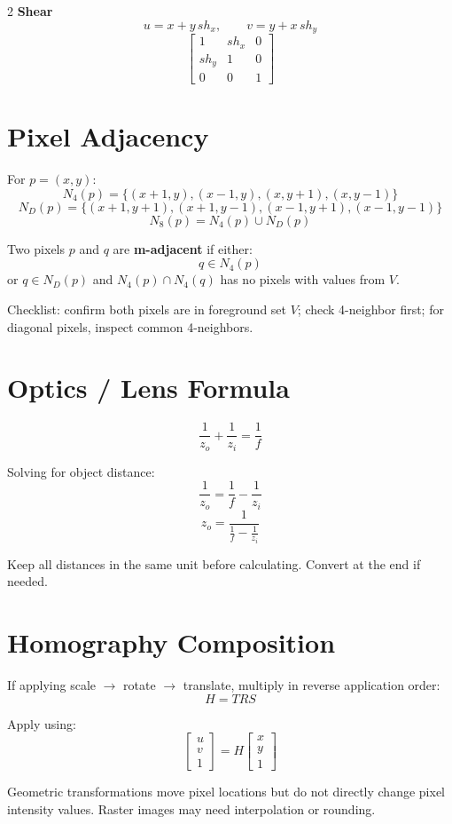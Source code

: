 \documentclass[8pt]{extarticle}
\begin{document}
\begin{multicols}{2}
\textbf{Shear}
\[
u=x+y\,sh_x,\qquad v=y+x\,sh_y
\]
\[
\begin{bmatrix}1&sh_x&0\\sh_y&1&0\\0&0&1\end{bmatrix}
\]

\section{Pixel Adjacency}

For $p=(x,y)$:
\[
N_4(p)=\{(x+1,y),(x-1,y),(x,y+1),(x,y-1)\}
\]
\[
N_D(p)=\{(x+1,y+1),(x+1,y-1),(x-1,y+1),(x-1,y-1)\}
\]
\[
N_8(p)=N_4(p)\cup N_D(p)
\]

Two pixels $p$ and $q$ are \textbf{m-adjacent} if either:
\[
q\in N_4(p)
\]
or $q\in N_D(p)$ and $N_4(p)\cap N_4(q)$ has no pixels with values from $V$.

Checklist: confirm both pixels are in foreground set $V$; check 4-neighbor first; for diagonal pixels, inspect common 4-neighbors.

\section{Optics / Lens Formula}

\[
\frac{1}{z_o}+\frac{1}{z_i}=\frac{1}{f}
\]

Solving for object distance:
\[
\frac{1}{z_o}=\frac{1}{f}-\frac{1}{z_i}
\]
\[
z_o=\frac{1}{\frac{1}{f}-\frac{1}{z_i}}
\]

Keep all distances in the same unit before calculating. Convert at the end if needed.

\section{Homography Composition}

If applying scale $\rightarrow$ rotate $\rightarrow$ translate, multiply in reverse application order:
\[
H=TRS
\]

Apply using:
\[
\begin{bmatrix}u\\v\\1\end{bmatrix}=H\begin{bmatrix}x\\y\\1\end{bmatrix}
\]

Geometric transformations move pixel locations but do not directly change pixel intensity values. Raster images may need interpolation or rounding.


\end{multicols}
\end{document}
